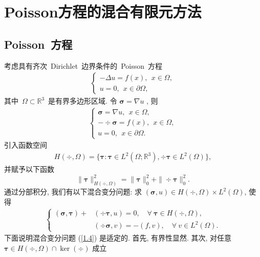 \chapter{Poisson方程的混合有限元方法}

\section{Poisson~方程}
	考虑具有齐次~Dirichlet~边界条件的~Poisson~方程
	\begin{align}\label{1.1}
		\left\{
		\begin{array}{ll}
			-\Delta u= f (x), \ \ x\in \Omega, \\
			u = 0, \ \ x\in \partial\Omega,
		\end{array}
		\right.
	\end{align}
	其中~$\Omega\subset\mathbb{R}^3$~是有界多边形区域. 令 $\boldsymbol\sigma=\nabla u$ , 则
	\begin{align}\label{1.2}
		\left\{
		\begin{array}{ll}
			\boldsymbol\sigma = \nabla u, \ \ x\in \Omega, \\
			-\div\boldsymbol\sigma = f (x), \ \ x\in \Omega, \\
			u = 0, \ \ x\in \partial\Omega.
		\end{array}
		\right.
	\end{align}
	引入函数空间
	\begin{align}\label{1.3}
		H(\div,\Omega)=\{\boldsymbol\tau: \boldsymbol\tau\in L^2(\Omega;\mathbb{R}^3), \div\boldsymbol\tau\in L^2(\Omega)\},
	\end{align}
	并赋予以下函数
	$$\|\boldsymbol\tau\|^2_{H(\div, \Omega)}=\|\boldsymbol\tau\|^2_0+\|\div\boldsymbol\tau\|^2_0.$$
	通过分部积分, 我们有以下混合变分问题: 求 $(\boldsymbol\sigma,u)\in H(\div,\Omega)\times L^2(\Omega)$, 使得
	\begin{align}\label{1.4}
		\left\{
		\begin{array}{ll}
			(\boldsymbol\sigma, \boldsymbol\tau)+&(\div\boldsymbol\tau, u) = 0, \quad \forall \ \boldsymbol\tau\in  H(\div,\Omega), \\
			&(\div\boldsymbol\sigma, v) = -(f, v), \quad \forall \ v\in L^2(\Omega).
		\end{array}
		\right.
	\end{align}
	下面说明混合变分问题 (\ref{1.4}) 是适定的. 首先, 有界性显然. 其次,
	对任意 $\boldsymbol\tau\in H(\div,\Omega)\cap\ker(\div)$ 成立
